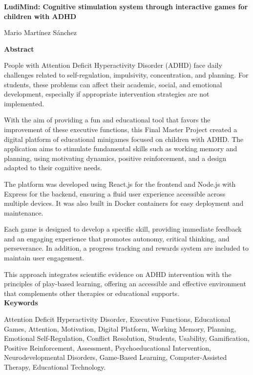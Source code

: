 \documentclass[10pt]{article}
\begin{document}
\begin{center}
    \textbf{LudiMind: Cognitive stimulation system through interactive games for children with ADHD}
    
    Mario Martínez Sánchez
\end{center}
\vspace{2cm}

\textbf{Abstract}

People with Attention Deficit Hyperactivity Disorder (ADHD) face daily challenges related to self-regulation, impulsivity, concentration, and planning. 
For students, these problems can affect their academic, social, and emotional development, especially if appropriate intervention strategies are not implemented.

With the aim of providing a fun and educational tool that favors the improvement of these executive functions, this Final Master Project created a digital platform of educational minigames focused on children with ADHD. The application aims to stimulate fundamental skills such as working memory and planning, using motivating dynamics, positive reinforcement, and a design adapted to their cognitive needs.

The platform was developed using React.js for the frontend and Node.js with Express for the backend, ensuring a fluid user experience accessible across multiple devices. It was also built in Docker containers for easy deployment and maintenance.

Each game is designed to develop a specific skill, providing immediate feedback and an engaging experience that promotes autonomy, critical thinking, and perseverance. In addition, a progress tracking and rewards system are included to maintain user engagement.

This approach integrates scientific evidence on ADHD intervention with the principles of play-based learning, offering an accessible and effective environment that complements other therapies or educational supports.
\\

\textbf{Keywords}

Attention Deficit Hyperactivity Disorder, Executive Functions, Educational Games, Attention, Motivation, Digital Platform, Working Memory, Planning, Emotional Self-Regulation, Conflict Resolution, Students, Usability, Gamification, Positive Reinforcement, Assessment, Psychoeducational Intervention, Neurodevelopmental Disorders, Game-Based Learning, Computer-Assisted Therapy, Educational Technology.
\newpage
\end{document}
